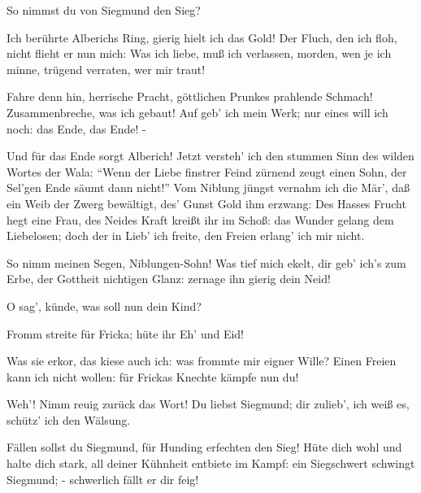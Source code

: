 \begin{drama}
\Brunnhildespeaks
So nimmst du von Siegmund den Sieg?
 

\Wotanspeaks
Ich berührte Alberichs Ring,
gierig hielt ich das Gold!
Der Fluch, den ich floh,
nicht flieht er nun mich:
Was ich liebe, muß ich verlassen,
morden, wen je ich minne,
trügend verraten, wer mir traut!
 




Fahre denn hin, herrische Pracht,
göttlichen Prunkes prahlende Schmach!
Zusammenbreche, was ich gebaut!
Auf geb' ich mein Werk; nur eines will ich noch:
das Ende,
das Ende! -
 



Und für das Ende sorgt Alberich!
Jetzt versteh' ich den stummen Sinn
des wilden Wortes der Wala:
``Wenn der Liebe finstrer Feind
zürnend zeugt einen Sohn,
der Sel'gen Ende säumt dann nicht!''
Vom Niblung jüngst vernahm ich die Mär',
daß ein Weib der Zwerg bewältigt,
des' Gunst Gold ihm erzwang:
Des Hasses Frucht hegt eine Frau,
des Neides Kraft kreißt ihr im Schoß:
das Wunder gelang dem Liebelosen;
doch der in Lieb' ich freite,
den Freien erlang' ich mir nicht.
 



So nimm meinen Segen, Niblungen-Sohn!
Was tief mich ekelt, dir geb' ich's zum Erbe,
der Gottheit nichtigen Glanz:
zernage ihn gierig dein Neid!
 

\Brunnhildespeaks


O sag', künde, was soll nun dein Kind?
 

\Wotanspeaks


Fromm streite für Fricka; hüte ihr Eh' und Eid!


Was sie erkor, das kiese auch ich:
was frommte mir eigner Wille?
Einen Freien kann ich nicht wollen:
für Frickas Knechte kämpfe nun du!
 

\Brunnhildespeaks
Weh'! Nimm reuig zurück das Wort!
Du liebst Siegmund;
dir zulieb', ich weiß es, schütz' ich den Wälsung.
 

\Wotanspeaks
Fällen sollst du Siegmund,
für Hunding erfechten den Sieg!
Hüte dich wohl und halte dich stark,
all deiner Kühnheit entbiete im Kampf:
ein Siegschwert schwingt Siegmund; -
schwerlich fällt er dir feig!
 


\end{drama}

